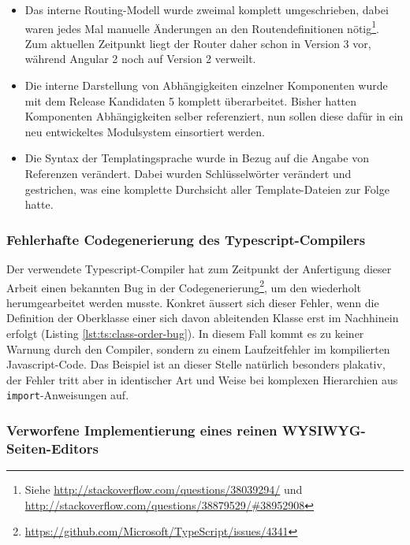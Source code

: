 \begin{itemize}[noitemsep]
\item Das interne Routing-Modell wurde zweimal komplett umgeschrieben, dabei waren jedes Mal manuelle Änderungen an den Routendefinitionen nötig\footnote{Siehe \url{http://stackoverflow.com/questions/38039294/} und \\ \url{http://stackoverflow.com/questions/38879529/\#38952908}}. Zum aktuellen Zeitpunkt liegt der Router daher schon in Version 3 vor, während Angular 2 noch auf Version 2 verweilt.
\item Die interne Darstellung von Abhängigkeiten einzelner Komponenten wurde mit dem Release Kandidaten 5 komplett überarbeitet. Bisher hatten Komponenten Abhängigkeiten selber referenziert, nun sollen diese dafür in ein neu entwickeltes Modulsystem einsortiert werden.
\item Die Syntax der Templatingsprache wurde in Bezug auf die Angabe von Referenzen verändert. Dabei wurden Schlüsselwörter verändert und gestrichen, was eine komplette Durchsicht aller Template-Dateien zur Folge hatte.
\end{itemize}

\subsubsection{Fehlerhafte Codegenerierung des Typescript-Compilers}

Der verwendete Typescript-Compiler hat zum Zeitpunkt der Anfertigung dieser Arbeit einen bekannten Bug in der Codegenerierung\footnote{\url{https://github.com/Microsoft/TypeScript/issues/4341}}, um den wiederholt herumgearbeitet werden musste. Konkret äussert sich dieser Fehler, wenn die Definition der Oberklasse einer sich davon ableitenden Klasse erst im Nachhinein erfolgt (Listing \ref{lst:ts:class-order-bug}). In diesem Fall kommt es zu keiner Warnung durch den Compiler, sondern zu einem Laufzeitfehler im kompilierten Javascript-Code. Das Beispiel ist an dieser Stelle natürlich besonders plakativ, der Fehler tritt aber in identischer Art und Weise bei komplexen Hierarchien aus \texttt{import}-Anweisungen auf.



\subsubsection{Verworfene Implementierung eines reinen WYSIWYG-Seiten-Editors}

